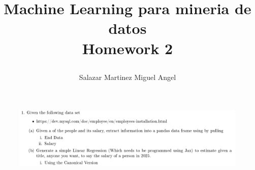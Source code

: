 \documentclass[12pt]{report}
\title{
	\begin{center}
		Machine Learning para mineria de datos\\
		Homework 2
		
	\end{center}
}
\author{Salazar Martinez Miguel Angel}
\begin{document}
	\renewcommand{\arraystretch}{1.3}
	
	\maketitle
	
\begin{figure}[H]
	\centering
	\includegraphics[width=1\textwidth]{screenshot001}
\end{figure}
\end{document}
